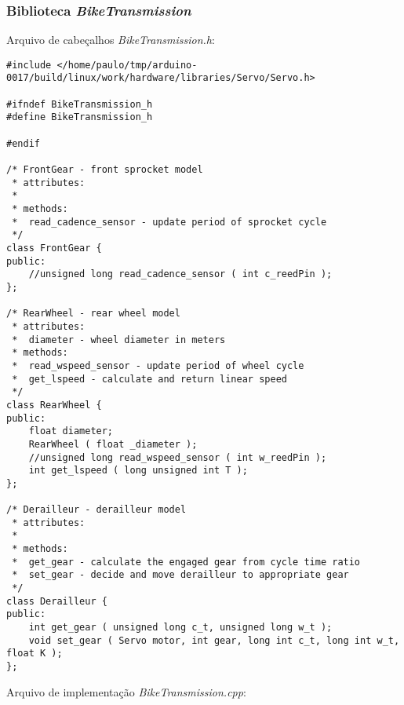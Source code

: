 \documentclass[a4paper,11pt]{article}
\begin{document}
\subsubsection{Biblioteca \textit{BikeTransmission}}
\label{code: biblioteca}
Arquivo de cabeçalhos \textit{BikeTransmission.h}:
\begin{lstlisting}
#include </home/paulo/tmp/arduino-0017/build/linux/work/hardware/libraries/Servo/Servo.h>

#ifndef BikeTransmission_h
#define BikeTransmission_h

#endif

/* FrontGear - front sprocket model
 * attributes:
 *
 * methods:
 *  read_cadence_sensor - update period of sprocket cycle
 */
class FrontGear {
public:
    //unsigned long read_cadence_sensor ( int c_reedPin );
};

/* RearWheel - rear wheel model
 * attributes:
 *  diameter - wheel diameter in meters
 * methods:
 *  read_wspeed_sensor - update period of wheel cycle
 *  get_lspeed - calculate and return linear speed
 */
class RearWheel {
public:
    float diameter;
    RearWheel ( float _diameter );
    //unsigned long read_wspeed_sensor ( int w_reedPin );
    int get_lspeed ( long unsigned int T );
};

/* Derailleur - derailleur model
 * attributes:
 *
 * methods:
 *  get_gear - calculate the engaged gear from cycle time ratio
 *  set_gear - decide and move derailleur to appropriate gear
 */
class Derailleur {
public:
    int get_gear ( unsigned long c_t, unsigned long w_t );
    void set_gear ( Servo motor, int gear, long int c_t, long int w_t, float K );
};
\end{lstlisting}
Arquivo de implementação \textit{BikeTransmission.cpp}:
\end{document}
